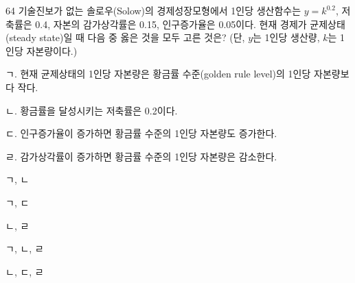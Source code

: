 \begin{question}{64}
기술진보가 없는 솔로우(Solow)의 경제성장모형에서 1인당 생산함수는 $y=k^{0.2}$, 저축률은 0.4, 자본의 감가상각률은 0.15, 인구증가율은 0.05이다. 현재 경제가 균제상태(steady state)일 때 다음 중 옳은 것을 모두 고른 것은? (단, $y$는 1인당 생산량, $k$는 1인당 자본량이다.)
\begin{framedtext}
ㄱ. 현재 균제상태의 1인당 자본량은 황금률 수준(golden rule level)의 1인당 자본량보다 작다. \par
ㄴ. 황금률을 달성시키는 저축률은 0.2이다. \par
ㄷ. 인구증가율이 증가하면 황금률 수준의 1인당 자본량도 증가한다. \par
ㄹ. 감가상각률이 증가하면 황금률 수준의 1인당 자본량은 감소한다.
\end{framedtext}
\begin{choices}
  \item ㄱ, ㄴ
  \item ㄱ, ㄷ
  \item ㄴ, ㄹ
  \item ㄱ, ㄴ, ㄹ
  \item ㄴ, ㄷ, ㄹ
\end{choices}
\end{question}
